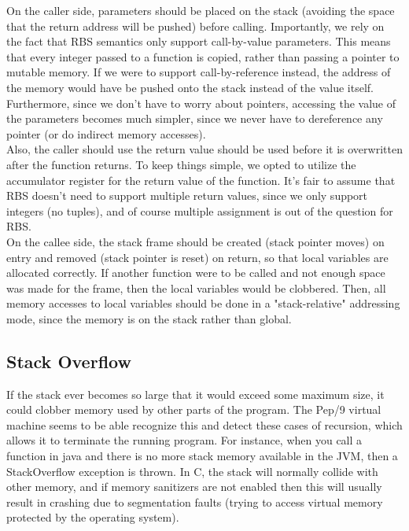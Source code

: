 \documentclass[12pt]{article}
\begin{document}
On the caller side, parameters should be placed on the stack (avoiding the space that the return address will be pushed) before calling. Importantly, we rely on the fact that RBS semantics only support call-by-value parameters. This means that every integer passed to a function is copied, rather than passing a pointer to mutable memory. If we were to support call-by-reference instead, the address of the memory would have be pushed onto the stack instead of the value itself. Furthermore, since we don't have to worry about pointers, accessing the value of the parameters becomes much simpler, since we never have to dereference any pointer (or do indirect memory accesses). \\

Also, the caller should use the return value should be used before it is overwritten after the function returns. To keep things simple, we opted to utilize the accumulator register for the return value of the function. It's fair to assume that RBS doesn't need to support multiple return values, since we only support integers (no tuples), and of course multiple assignment is out of the question for RBS.  \\

On the callee side, the stack frame should be created (stack pointer moves) on entry and removed (stack pointer is reset) on return, so that local variables are allocated correctly. If another function were to be called and not enough space was made for the frame, then the local variables would be clobbered. Then, all memory accesses to local variables should be done in a "stack-relative" addressing mode, since the memory is on the stack rather than global.

\subsection*{Stack Overflow}
If the stack ever becomes so large that it would exceed some maximum size, it could clobber memory used by other parts of the program. The Pep/9 virtual machine seems to be able recognize this and detect these cases of recursion, which allows it to terminate the running program. For instance, when you call a function in java and there is no more stack memory available in the JVM, then a StackOverflow exception is thrown. In C, the stack will normally collide with other memory, and if memory sanitizers are not enabled then this will usually result in crashing due to segmentation faults (trying to access virtual memory protected by the operating system). \\
\end{document}
